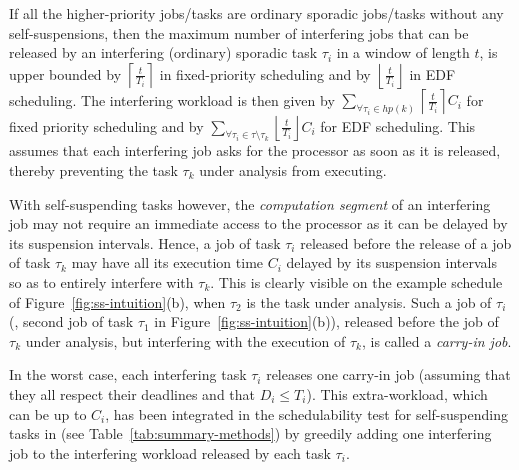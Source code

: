 \label{sec:model-carry-in}

If all the higher-priority jobs/tasks are ordinary sporadic jobs/tasks without any self-suspensions, then
the maximum number of interfering jobs that can be released by an interfering (ordinary) sporadic task $\tau_i$ in a window of length $t$, is upper bounded by $\left\lceil \frac{t}{T_i} \right\rceil$ in fixed-priority scheduling and by $\left\lfloor \frac{t}{T_i} \right\rfloor$ in EDF scheduling. The interfering workload is then given by $\sum_{\forall \tau_i \in hp(k)} \left\lceil \frac{t}{T_i} \right\rceil C_i$ for fixed priority scheduling and by $\sum_{\forall \tau_i \in \tau \setminus \tau_k} \left\lfloor \frac{t}{T_i} \right\rfloor C_i$ for EDF scheduling. This assumes that each interfering job asks for the processor as soon as it is released, thereby preventing the task $\tau_k$ under analysis from executing.

With self-suspending tasks however, the \emph{computation segment} of an interfering job may not require an immediate access to the processor as it can be delayed by its suspension intervals. Hence, a job of task $\tau_i$ released before the release of a job of task $\tau_k$ may have all its execution time $C_i$ delayed by its suspension intervals so as to entirely interfere with $\tau_k$. 
This is clearly visible on the example schedule of Figure~\ref{fig:ss-intuition}(b), when $\tau_2$ is the task under analysis.
Such a job of $\tau_i$ (\eg, second job of task $\tau_1$ in Figure~\ref{fig:ss-intuition}(b)), released before the job of $\tau_k$ under analysis, but interfering with the execution of $\tau_k$, is called a \emph{carry-in job}.

In the worst case, each interfering task $\tau_i$ releases one carry-in job (assuming that they all respect their deadlines and that $D_i \leq T_i$). This extra-workload, which can be up to $C_i$, has been integrated in the schedulability test for self-suspending tasks in \cite{huangpass:dac2015,LiuChen:rtss2014} (see Table~\ref{tab:summary-methods}) by greedily adding one interfering job to the interfering workload released by each task $\tau_i$.




